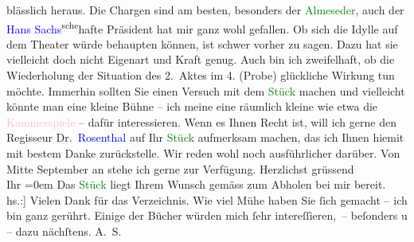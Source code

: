                blässlich heraus. Die Chargen sind am besten, besonders der \textcolor{green}{Almeseder}{}, auch der \textcolor{blue}{Hans Sachs}{}\ledrightnote{\textcolor{blue}{Hans Sachs}}\substVorne{}\textsuperscript{sche}\substDazwischen{}hafte\substHinten{} Präsident hat mir ganz wohl gefallen.\pend
           \pstart
           Ob sich die Idylle auf dem Theater würde behaupten können, ist schwer vorher zu
               sagen. Dazu hat sie vielleicht doch nicht Eigenart und Kraft genug. Auch bin ich
               zweifelhaft, ob die Wiederholung der Situation des 2. Aktes im 4. (Probe) glückliche
               Wirkung tun möchte. Immerhin sollten Sie einen Versuch mit dem {\pb}\textcolor{green}{Stück}{} machen und vielleicht
               könnte man eine kleine Bühne – ich meine eine räumlich kleine wie etwa die \textcolor{pink}{Kammerspiele}{}\ledrightnote{\textcolor{pink}{Kammerspiele Wien}} – dafür interessieren. Wenn es Ihnen
               Recht ist, will ich gerne den Regisseur Dr. \textcolor{blue}{Rosenthal}{}\ledrightnote{\textcolor{blue}{Friedrich Rosenthal}} auf Ihr \textcolor{green}{Stück}{}
               aufmerksam machen, das ich Ihnen hiemit mit bestem Danke zurückstelle. Wir reden wohl
               noch ausführlicher darüber. Von Mitte September an stehe ich gerne zur
               Verfügung.\pend
           \pstart
           Herzlichst grüssend{\\[\baselineskip]}Ihr \pend
           \leftskip=0em{}\pstart
           \noindent{}Das \textcolor{green}{Stück}{} liegt Ihrem Wunsch
                  gemäss zum Abholen bei mir bereit.\pend
           \pstart
           \noindent{}{[}hs.:{]} Vielen Dank für das Verzeichnis. Wie viel Mühe haben Sie ſich gemacht –
               ich bin ganz gerührt. Einige der Bücher würden mich ſehr intereſſieren, – beſonders
                  \label{K_L02298_1v}\label{K_L02298_1h} u \label{K_L02298_2v}\label{K_L02298_2h} – dazu nächſtens. \spacefill\mbox{A. S.}\pend
           \endnumbering{}  
      